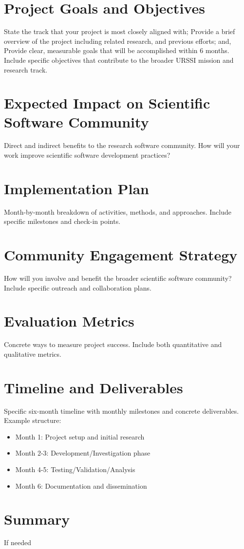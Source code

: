 \documentclass[letterpaper, 11pt]{article}
\begin{document}
\section{Project Goals and Objectives}

State the track that your project is most closely aligned with; Provide a brief overview of the project including related research, and previous efforts; and, Provide clear, measurable goals that will be accomplished within 6 months. Include specific objectives that contribute to the broader URSSI mission and research track.

\section{Expected Impact on Scientific Software Community}

Direct and indirect benefits to the research software community. How will your work improve scientific software development practices?

\section{Implementation Plan}

Month-by-month breakdown of activities, methods, and approaches. Include specific milestones and check-in points.

\section{Community Engagement Strategy}

How will you involve and benefit the broader scientific software community? Include specific outreach and collaboration plans.

\section{Evaluation Metrics}

Concrete ways to measure project success. Include both quantitative and qualitative metrics.

\section{Timeline and Deliverables}

Specific six-month timeline with monthly milestones and concrete deliverables. Example structure:

\begin{itemize}
  \item Month 1: Project setup and initial research
  \item Month 2-3: Development/Investigation phase
  \item Month 4-5: Testing/Validation/Analysis
  \item Month 6: Documentation and dissemination
\end{itemize}

\section{Summary}

If needed

%
\vspace*{-0.25cm}
\begin{footnotesize}
%
%
\end{footnotesize}
\end{document}
